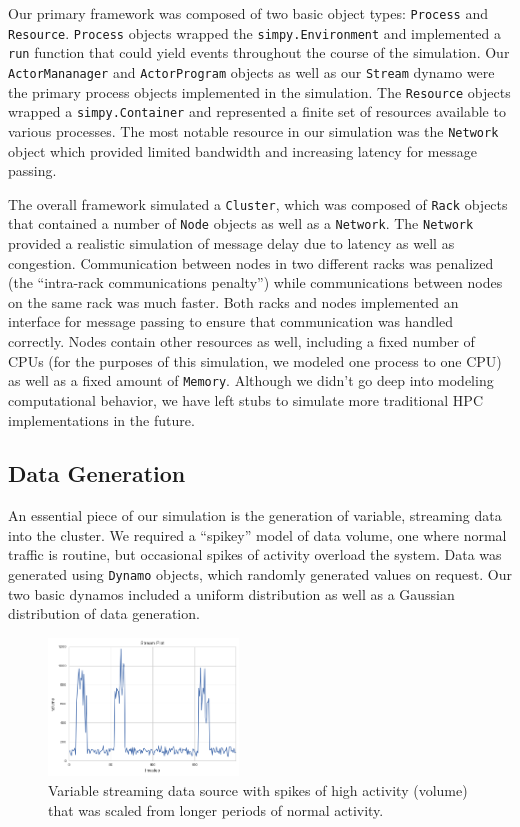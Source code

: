 \documentclass[draftclsnofoot,onecolumn,conference,11pt]{IEEEtran}
\begin{document}
Our primary framework was composed of two basic object types: \texttt{Process} and \texttt{Resource}. \texttt{Process} objects wrapped the \texttt{simpy.Environment} and implemented a \texttt{run} function that could yield events throughout the course of the simulation. Our \texttt{ActorMananager} and \texttt{ActorProgram} objects as well as our \texttt{Stream} dynamo were the primary process objects implemented in the simulation. The \texttt{Resource} objects wrapped a \texttt{simpy.Container} and represented a finite set of resources available to various processes. The most notable resource in our simulation was the \texttt{Network} object which provided limited bandwidth and increasing latency for message passing.

The overall framework simulated a \texttt{Cluster}, which was composed of \texttt{Rack} objects that contained a number of \texttt{Node} objects as well as a \texttt{Network}. The \texttt{Network} provided a realistic simulation of message delay due to latency as well as congestion. Communication between nodes in two different racks was penalized (the ``intra-rack communications penalty'') while communications between nodes on the same rack was much faster. Both racks and nodes implemented an interface for message passing to ensure that communication was handled correctly. Nodes contain other resources as well, including a fixed number of CPUs (for the purposes of this simulation, we modeled one process to one CPU) as well as a fixed amount of \texttt{Memory}. Although we didn't go deep into modeling computational behavior, we have left stubs to simulate more traditional HPC implementations in the future.

\subsection{Data Generation}

An essential piece of our simulation is the generation of variable, streaming data into the cluster. We required a ``spikey'' model of data volume, one where normal traffic is routine, but occasional spikes of activity overload the system. Data was generated using \texttt{Dynamo} objects, which randomly generated values on request. Our two basic dynamos included a uniform distribution as well as a Gaussian distribution of data generation.

\begin{figure}[!t]
    \centering
    \includegraphics[width=0.45\textwidth]{streaming}
    \caption{Variable streaming data source with spikes of high activity (volume) that was scaled from longer periods of normal activity. }
    \label{fig:streaming}
\end{figure}
\end{document}
